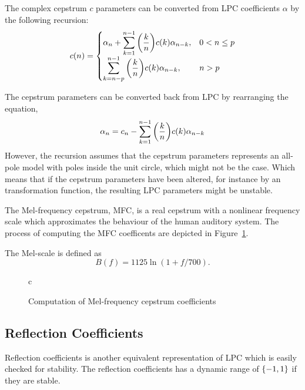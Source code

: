 The complex cepstrum $c$ parameters can be converted from LPC coefficients $\alpha$ by the following recursion:
\begin{equation}
	c(n) = \begin{cases}
		\alpha_n+{\displaystyle\sum_{k=1}^{n-1} \left(\frac{k}{n}\right)} c(k) \alpha_{n-k}, & 0<n\leq p\\
		{\displaystyle\sum_{k=n-p}^{n-1} \left(\frac{k}{n}\right)} c(k) \alpha_{n-k}, & n > p\\
	\end{cases}
\end{equation}

The cepstrum parameters can be converted back from LPC by rearranging the equation,
\begin{equation}
	\alpha_n = c_n-{\displaystyle\sum_{k=1}^{n-1} \left(\frac{k}{n}\right)} c(k) \alpha_{n-k}
\end{equation}
However, the recursion assumes that the cepstrum parameters represents an all-pole model with poles inside the unit circle, which might not be the case. Which means that if the cepstrum parameters have been altered, for instance by an transformation function, the resulting LPC parameters might be unstable.


The Mel-frequency cepstrum, MFC, is a real cepstrum with a nonlinear frequency scale which approximates the behaviour of the human auditory system. The process of computing the MFC coefficents are depicted in Figure~\ref{fig:mfcc}.

The Mel-scale is defined as \cite{taletek}
\begin{equation}
	B(f) = 1125\ln(1+f/700).
\end{equation}

\begin{figure}[htbp]
  \centering
  \begin{tabular}[h]{c}
  \end{tabular}
  \caption{Computation of Mel-frequency cepstrum coefficients}
  \label{fig:mfcc}
\end{figure}

\subsection{Reflection Coefficients} %
\label{sub:reflection_coefficients}
Reflection coefficients is another equivalent representation of LPC which is easily checked for stability. The reflection coefficients has a dynamic range of $\lbrace-1,1\rbrace$ if they are stable. 

